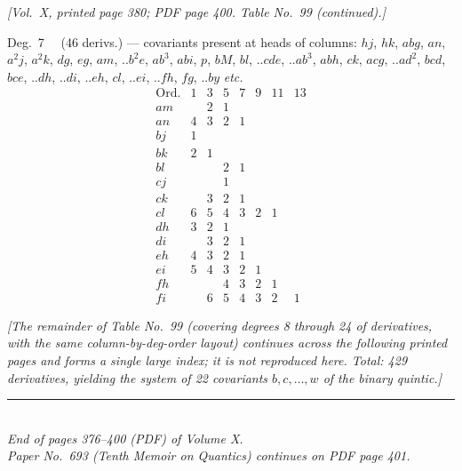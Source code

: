 \documentclass[11pt]{article}
\begin{document}
\newpage

\noindent\textit{[Vol.~X, printed page 380; PDF page 400. Table No.~99 (continued).]}

\medskip

\noindent Deg.\ 7 \ \ (46 derivs.) --- covariants present at heads of columns: $hj$, $hk$, $abg$, $an$, $a^{2}j$, $a^{2}k$, $dg$, $eg$, $am$, $..b^{2}e$, $ab^{3}$, $abi$, $p$, $bM$, $bl$, $..cde$, $..ab^{3}$, $abh$, $ck$, $acg$, $..ad^{2}$, $bcd$, $bce$, $..dh$, $..di$, $..eh$, $cl$, $..ei$, $..fh$, $fg$, $..by$ \emph{etc.}
\[
\begin{array}{l|ccccccc}
\text{Ord.} & 1 & 3 & 5 & 7 & 9 & 11 & 13 \\\hline
am & & 2 & 1 & & & & \\
an & 4 & 3 & 2 & 1 & & & \\
bj & 1 & & & & & & \\
bk & 2 & 1 & & & & & \\
bl & & & 2 & 1 & & & \\
cj & & & 1 & & & & \\
ck & & 3 & 2 & 1 & & & \\
cl & 6 & 5 & 4 & 3 & 2 & 1 & \\
dh & 3 & 2 & 1 & & & & \\
di & & 3 & 2 & 1 & & & \\
eh & 4 & 3 & 2 & 1 & & & \\
ei & 5 & 4 & 3 & 2 & 1 & & \\
fh & & & 4 & 3 & 2 & 1 & \\
fi & & 6 & 5 & 4 & 3 & 2 & 1
\end{array}
\]

\bigskip

\noindent\textit{[The remainder of Table No.~99 (covering degrees 8 through 24 of derivatives, with the same column-by-deg-order layout) continues across the following printed pages and forms a single large index; it is not reproduced here. Total: 429 derivatives, yielding the system of 22 covariants $b, c, \ldots, w$ of the binary quintic.]}

\bigskip
\bigskip

\begin{center}
\rule{0.4\textwidth}{0.4pt}\\[2pt]
\textit{End of pages 376--400 (PDF) of Volume X.}\\
\textit{Paper No.~693 (Tenth Memoir on Quantics) continues on PDF page 401.}
\end{center}
\end{document}
